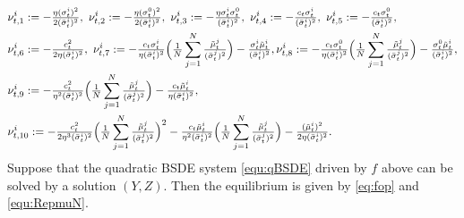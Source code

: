 \documentclass[10pt,a4paper]{article}
\theoremstyle{plain}
\theoremstyle{definition}
\numberwithin{equation}{section}
\begin{document}
\begin{align}
& \nu_{t,1}^{i} := -\tfrac{\eta (\sigma_{t}^{i})^{2}}{2(\bar{\sigma}_{t}^{i})^{2}}, \
\nu_{t,2}^{i} := -\tfrac{\eta (\sigma_{t}^{0})^{2}}{2(\bar{\sigma}_{t}^{i})^{2}},   \
\nu_{t,3}^{i} := -\tfrac{\eta\sigma_{t}^{i}\sigma_{t}^{0}}{(\bar{\sigma}_{t}^{i})^{2}},   \
\nu_{t,4}^{i} := -\tfrac{c_{t}\sigma_{t}^{i}}{(\bar{\sigma}_{t}^{i})^{2}}  ,  \
\nu_{t,5}^{i} := -\tfrac{c_{t}\sigma_{t}^{0}}{(\bar{\sigma}_{t}^{i})^{2}}  ,  
\label{equ:nu1-5} \\
&\nu_{t,6}^{i} := -\tfrac{c_{t}^{2}}{2\eta(\bar{\sigma}_{t}^{i})^{2}},  \ \nu_{t,7}^{i} := -\tfrac{c_{t}\sigma_{t}^{i}}{\eta(\bar{\sigma}_{t}^{i})^{2}}\Bigl(\tfrac{1}{N}\sum_{j=1}^{N}\tfrac{\tilde{\mu}_{t}^{j}}{(\bar{\sigma}_{t}^{j})^{2}}\Bigr) - \tfrac{\sigma_{t}^{i}\tilde{\mu}_{t}^{i}}{(\bar{\sigma}_{t}^{i})^{2}}, \nu_{t,8}^{i} := -\tfrac{c_{t}\sigma_{t}^{0}}{\eta(\bar{\sigma}_{t}^{i})^{2}}\Bigl(\tfrac{1}{N}\sum_{j=1}^{N}\tfrac{\tilde{\mu}_{t}^{j}}{(\bar{\sigma}_{t}^{j})^{2}}\Bigr) - \tfrac{\sigma_{t}^{0}\tilde{\mu}_{t}^{i}}{(\bar{\sigma}_{t}^{i})^{2}} \label{equ:nu678}, \\
&\nu_{t,9}^{i} := -\tfrac{c_{t}^{2}}{\eta^{2}(\bar{\sigma}_{t}^{i})^{2}}\Bigl(\tfrac{1}{N}\sum_{j=1}^{N}\tfrac{\tilde{\mu}_{t}^{j}}{(\bar{\sigma}_{t}^{j})^{2}}\Bigr) - \tfrac{c_{t}\tilde{\mu}_{t}^{i}}{\eta(\bar{\sigma}_{t}^{i})^{2}} \label{equ:nu9}, \\
&\nu_{t,10}^{i} := -\tfrac{c_{t}^{2}}{2\eta^{3}(\bar{\sigma}_{t}^{i})^{2}}\Bigl(\tfrac{1}{N}\sum_{j=1}^{N}\tfrac{\tilde{\mu}_{t}^{j}}{(\bar{\sigma}_{t}^{j})^{2}}\Bigr)^{2} - \tfrac{c_{t}\tilde{\mu}_{t}^{i}}{\eta^{2}(\bar{\sigma}_{t}^{i})^{2}}\Bigl(\tfrac{1}{N}\sum_{j=1}^{N}\tfrac{\tilde{\mu}_{t}^{j}}{(\bar{\sigma}_{t}^{j})^{2}}\Bigr) - \tfrac{(\tilde{\mu}_{t}^{i})^{2}}{2\eta(\bar{\sigma}_{t}^{i})^{2}}\label{equ:nu10}.
\end{align}
Suppose that the quadratic BSDE system \eqref{equ:qBSDE} driven by $f$ above can be solved by a solution $(Y,Z)$. Then the equilibrium is given by \eqref{eq:fop} and \eqref{equ:RepmuN}.
\end{document}
